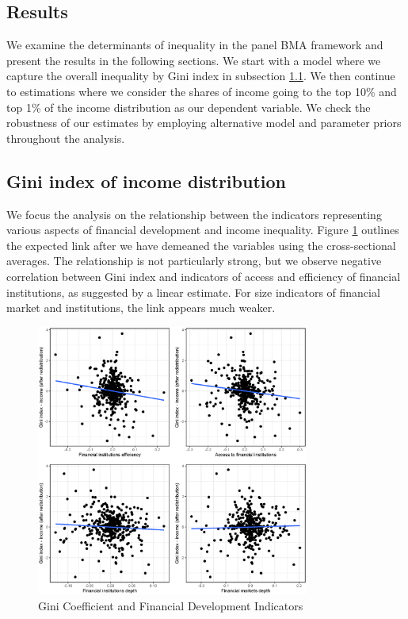 \begin{refsection}
\section{Results}
\label{ch4sec:results}
We examine the determinants of inequality in the panel \ac{BMA} framework and present the results in the following sections. We start with a model where we capture the overall inequality by Gini index in subsection \ref{ch4subsec:gini}. We then continue to estimations where we consider the shares of income going to the top 10\% and top 1\% of the income distribution as our dependent variable. We check the robustness of our estimates by employing alternative model and parameter priors throughout the analysis.

\subsection{Gini index of income distribution}\label{ch4subsec:gini}
We focus the analysis on the relationship between the indicators representing various aspects of financial development and income inequality. Figure \ref{ch4fig:gini_findev_dm} outlines the expected link after we have demeaned the variables using the cross-sectional averages. The relationship is not particularly strong, but we observe negative correlation between Gini index and indicators of access and efficiency of financial institutions, as suggested by a linear estimate. For size indicators of financial market and institutions, the link appears much weaker.

\begin{figure}[ht!]
  \caption{Gini Coefficient and Financial Development Indicators}
  \label{ch4fig:gini_findev_dm}
  \centering
  \includegraphics[width=0.8\textwidth, keepaspectratio]{figures/ch4/plots_findev_gini_dm}
\end{figure}


\end{refsection}
